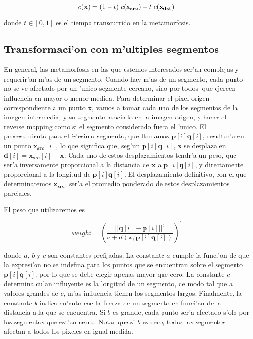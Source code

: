\begin{equation}
c(\mathbf{x}) = (1 - t) \hspace{0.1cm}c(\mathbf{x_{src}}) + t \hspace{0.1cm} c(\mathbf{x_{dst}})
\label{eq_blend}
\end{equation}

\noindent
donde $t \in [0, 1]$ es el tiempo transcurrido en la metamorfosis.

\subsection{Transformaci'on con m'ultiples segmentos}

En general, las metamorfosis en las que estemos interesados ser'an complejas y requerir'an m'as de un segmento. Cuando hay m'as de un segmento, cada punto no se ve afectado por un 'unico segmento cercano, sino por todos, que ejercen influencia en mayor o menor medida. Para determinar el pixel origen correspondiente a un punto $\mathbf{x}$, vamos a tomar cada uno de los segmentos de la imagen intermedia, y su segmento asociado en la imagen origen, y hacer el reverse mapping como si el segmento considerado fuera el 'unico. El procesamiento para el $i$-'esimo segmento, que llamamos $\mathbf{p}[i]\mathbf{q}[i]$, resultar'a en un punto $\mathbf{x}_{\mathbf{src}}[i]$, lo que significa que, seg'un $\mathbf{p}[i]\mathbf{q}[i]$, $\mathbf{x}$ se desplaza en $\mathbf{d}[i] = \mathbf{x}_{\mathbf{src}}[i] - \mathbf{x}$. Cada uno de estos desplazamientos tendr'a un peso, que ser'a inversamente proporcional a la distancia de $\mathbf{x}$ a $\mathbf{p}[i]\mathbf{q}[i]$, y directamente proporcional a la longitud de $\mathbf{p}[i]\mathbf{q}[i]$. El desplazamiento definitivo, con el que determinaremos $\mathbf{x_{src}}$, ser'a el promedio ponderado de estos desplazamientos parciales.

El peso que utilizaremos es

\begin{equation}
weight = \left(\frac{||\mathbf{q}[i] - \mathbf{p}[i]||^c}{a + d(\mathbf{x}, \mathbf{p}[i]\mathbf{q}[i])}\right)^b
\label{eq_weight}
\end{equation}

\noindent
donde $a$, $b$ y $c$ son constantes prefijadas. La constante $a$ cumple la funci'on de que la expresi'on no se indefina para los puntos que se encuentran sobre el segmento $\mathbf{p}[i]\mathbf{q}[i]$, por lo que se debe elegir apenas mayor que cero. La constante $c$ determina cu'an influyente es la longitud de un segmento, de modo tal que a valores grandes de $c$, m'as influencia tienen los segmentos largos. Finalmente, la constante $b$ indica cu'anto cae la fuerza de un segmento en funci'on de la distancia a la que se encuentra. Si $b$ es grande, cada punto ser'a afectado s'olo por los segmentos que est'an cerca. Notar que si $b$ es cero, todos los segmentos afectan a todos los pixeles en igual medida.

